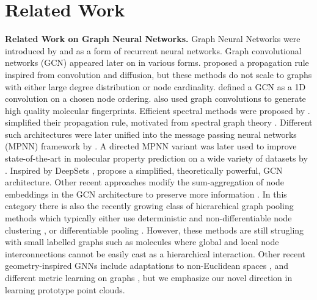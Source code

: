 \documentclass[letterpaper]{article} \usepackage{aaai22}  \usepackage{times}  \usepackage{helvet}  \usepackage{courier}  \usepackage[hyphens]{url}  \usepackage{graphicx} \urlstyle{rm} \def\UrlFont{\rm}  \usepackage{natbib}  \usepackage{caption} \DeclareCaptionStyle{ruled}{labelfont=normalfont,labelsep=colon,strut=off} \frenchspacing  \setlength{\pdfpagewidth}{8.5in}  \setlength{\pdfpageheight}{11in}  \usepackage{algorithm}
\begin{document}
\section{Related Work} \label{sec:rel}
\textbf{Related Work on Graph Neural Networks. }  Graph Neural Networks were introduced by \cite{gori2005new} and \cite{scarselli2008graph} as a form of recurrent neural networks. Graph convolutional networks (GCN) appeared later on in various forms.  \cite{duvenaud2015convolutional,atwood2016diffusion} proposed a propagation rule inspired from convolution and diffusion, but these methods do not scale to graphs with either large degree distribution or node cardinality. \cite{niepert2016learning} defined a GCN as a 1D convolution on a chosen node ordering.  \cite{kearnes2016molecular} also used graph convolutions to generate high quality molecular fingerprints. Efficient spectral methods were proposed by \cite{bruna2013spectral,NIPS2016_6081}. \cite{kipf2016semi} simplified their propagation rule, motivated from spectral graph theory \citep{hammond2011wavelets}. Different such architectures were later unified into the message passing neural networks (MPNN) framework by \cite{gilmer2017neural}. A directed MPNN variant was later used to improve state-of-the-art in molecular property prediction on a wide variety of datasets by \citep{yang2019analyzing}. Inspired by DeepSets \cite{zaheer2017deep}, \cite{xu2018powerful} propose a  simplified, theoretically powerful, GCN architecture. Other recent approaches modify the sum-aggregation of node embeddings in the GCN architecture to preserve more information \cite{kondor2018covariant,hongbin2020geomgcn}. In this category there is also the recently growing class of hierarchical graph pooling methods which typically either use deterministic and non-differentiable
node clustering \citep{NIPS2016_6081,jin2018junction}, or differentiable pooling \citep{ying2018hierarchical,noutahi2019towards,gao2019graph}. However, these methods are still strugling with small labelled graphs such as molecules where global and local node interconnections cannot be easily cast as a hierarchical interaction. Other recent geometry-inspired GNNs include adaptations to  non-Euclidean spaces \citep{liu2019hyperbolic,chami2019hyperbolic,bachmann2019constant, fey2020deep}, and different metric learning on graphs \citep{riba2018learning, bai2019simgnn, li2019graph}, but we emphasize our novel direction in learning prototype point clouds.
\end{document}
